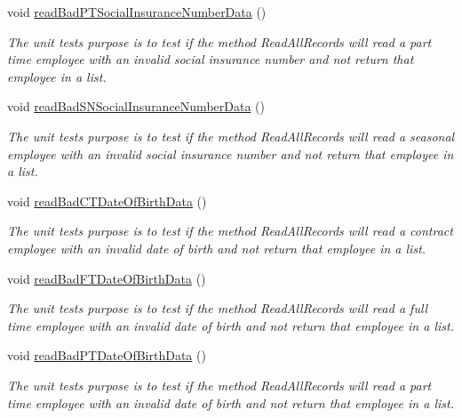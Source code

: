 \begin{DoxyCompactItemize}
void \hyperlink{class_file_i_o_tests_1_1_file_i_o_tests_a1742ca38a92a76dea23805e7927573d5}{read\+Bad\+P\+T\+Social\+Insurance\+Number\+Data} ()
\begin{DoxyCompactList}\small\item\em The unit test\textquotesingle{}s purpose is to test if the method Read\+All\+Records will read a part time employee with an invalid social insurance number and not return that employee in a list. \end{DoxyCompactList}\item 
void \hyperlink{class_file_i_o_tests_1_1_file_i_o_tests_a2b1261c39b325a04da207fe35095b58a}{read\+Bad\+S\+N\+Social\+Insurance\+Number\+Data} ()
\begin{DoxyCompactList}\small\item\em The unit test\textquotesingle{}s purpose is to test if the method Read\+All\+Records will read a seasonal employee with an invalid social insurance number and not return that employee in a list. \end{DoxyCompactList}\item 
void \hyperlink{class_file_i_o_tests_1_1_file_i_o_tests_a0655cfd9e705deaa02599ba1533270ef}{read\+Bad\+C\+T\+Date\+Of\+Birth\+Data} ()
\begin{DoxyCompactList}\small\item\em The unit test\textquotesingle{}s purpose is to test if the method Read\+All\+Records will read a contract employee with an invalid date of birth and not return that employee in a list. \end{DoxyCompactList}\item 
void \hyperlink{class_file_i_o_tests_1_1_file_i_o_tests_ac547d3676534cc2207e3ff806504f745}{read\+Bad\+F\+T\+Date\+Of\+Birth\+Data} ()
\begin{DoxyCompactList}\small\item\em The unit test\textquotesingle{}s purpose is to test if the method Read\+All\+Records will read a full time employee with an invalid date of birth and not return that employee in a list. \end{DoxyCompactList}\item 
void \hyperlink{class_file_i_o_tests_1_1_file_i_o_tests_af6ec136300bc783b54a4253dbab0d73c}{read\+Bad\+P\+T\+Date\+Of\+Birth\+Data} ()
\begin{DoxyCompactList}\small\item\em The unit test\textquotesingle{}s purpose is to test if the method Read\+All\+Records will read a part time employee with an invalid date of birth and not return that employee in a list. \end{DoxyCompactList}\item 

\end{DoxyCompactItemize}
